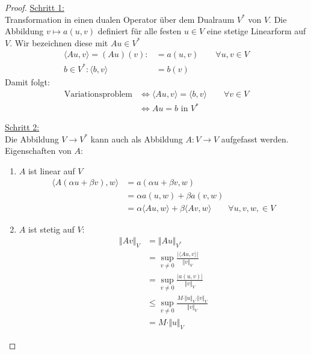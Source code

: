 \begin{proof}
	\underline{Schritt 1:}\\ 
	Transformation in einen dualen Operator über dem Dualraum $V^\ast$ von $V$. 
	Die Abbildung $v\mapsto a(u,v)$ definiert für alle festen $u\in V$ eine stetige Linearform auf $V$. 
	Wir bezeichnen diese mit $Au\in V^\ast$
	\begin{align*}
		\langle Au,v\rangle=(Au)(v):&=a(u,v)\qquad\forall u,v\in V \\
		b\in V^\ast: \langle b,v\rangle&=b(v)
	\end{align*}
	Damit folgt:
	\begin{align*}
		\text{Variationsproblem}&\Longleftrightarrow\langle Au,v\rangle=\langle b,v\rangle\qquad\forall v\in V\\
		&\Longleftrightarrow Au=b\text{ in }V^\ast
	\end{align*}
	
	\underline{Schritt 2:}\\
	Die Abbildung $V\to V^\ast$ kann auch als Abbildung $A:V\to V$ aufgefasst werden. 
	Eigenschaften von $A$:
	\begin{enumerate}[label=(\alph*)]
		\item $A$ ist linear auf $V$
		\begin{align*}
			\big\langle A(\alpha u+\beta v),w\big\rangle
			&=a(\alpha u+\beta v,w)\\
			&=\alpha a(u,w)+\beta a(v,w)\\
			&=\alpha\langle Au,w\rangle+\beta\langle Av,w\rangle\qquad\forall u,v,w,\in V
		\end{align*}
		\item $A$ ist stetig auf $V$:
		\begin{align*}
			\Vert A v\Vert_{V}
			&=\Vert A u\Vert_{V^\ast}\\
			&=\sup\limits_{v\neq0}\frac{\big|\langle Au,v\rangle\big|}{\Vert v\Vert_V}\\
			&=\sup\limits_{v\neq0}\frac{\big|a(u,v)\big|}{\Vert v\Vert_V}\\
			&\leq
			\sup\limits_{v\neq0}\frac{M\cdot\Vert u\Vert_V\cdot\Vert v\Vert_V}{\Vert v\Vert_V}\\
			&=M\cdot\Vert u\Vert_V
		\end{align*}
	\end{enumerate}
	

\end{proof}
